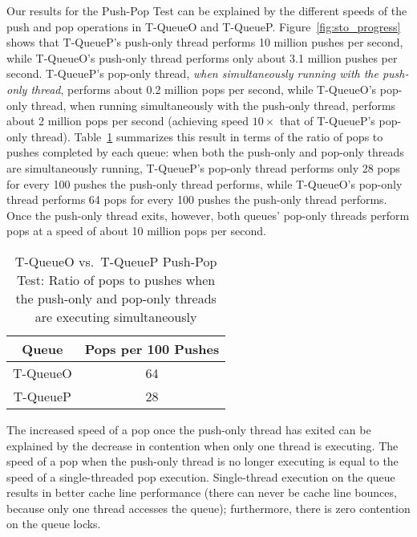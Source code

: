 Our results for the Push-Pop Test can be explained by the different speeds of the push and pop operations in T-QueueO and T-QueueP. 
Figure~\ref{fig:sto_progress} shows that T-QueueP's push-only thread performs 10 million pushes per second, while T-QueueO's push-only thread performs only about 3.1 million pushes per second. T-QueueP's pop-only thread, \emph{when simultaneously running with the push-only thread}, performs about 0.2 million pops per second, while T-QueueO's pop-only thread, when running simultaneously with the push-only thread, performs about 2 million pops per second (achieving speed $10\times$ that of T-QueueP's pop-only thread).
Table~\ref{tab:sto_pop_push_ratio} summarizes this result in terms of the ratio of pops to pushes completed by each queue: when both the push-only and pop-only threads are simultaneously running, T-QueueP's pop-only thread performs only 28 pops for every 100 pushes the push-only thread performs, while T-QueueO's pop-only thread performs 64 pops for every 100 pushes the push-only thread performs.
Once the push-only thread exits, however, both queues' pop-only threads perform pops at a speed of about 10 million pops per second. 

\begin{table}[t]
        \centering
    \begin{tabular}{|cc|}
        \hline
        Queue & Pops per 100 Pushes\\
        \hline
            T-QueueO & 64\\
            T-QueueP & 28\\
        \hline
    \end{tabular}
    \caption{T-QueueO vs.\ T-QueueP Push-Pop Test: Ratio of pops to pushes when the push-only and pop-only threads are executing simultaneously}
    \label{tab:sto_pop_push_ratio}
\end{table}

The increased speed of a pop once the push-only thread has exited can be explained by the decrease in contention when only one thread is executing. The speed of a pop when the push-only thread is no longer executing is equal to the speed of a single-threaded pop execution. Single-thread execution on the queue results in better cache line performance (there can never be cache line bounces, because only one thread accesses the queue); furthermore, there is zero contention on the queue locks. 


